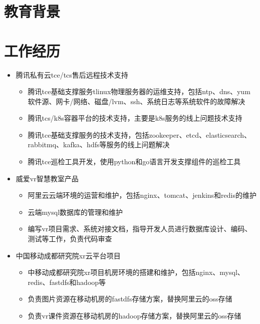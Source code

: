 \documentclass{resume}
\begin{document}
\section{教育背景}

\vspace{4mm}

\section{工作经历}
\begin{itemize}
  \item 腾讯私有云tce/tcs售后远程技术支持
  \begin{itemize}
    \item 腾讯tce基础支撑服务tlinux物理服务器的运维支持，包括ntp、dns、yum软件源、网卡/网络、磁盘/lvm、ssh、系统日志等系统软件的故障解决
    \item 腾讯tcs/k8s容器平台的技术支持，主要是k8s服务的线上问题技术支持
    \item 腾讯tce基础支撑服务的技术支持，包括zookeeper、etcd、elasticsearch、rabbitmq、kafka、hdfs等服务的线上问题解决
    \item 腾讯tce巡检工具开发，使用python和go语言开发支撑组件的巡检工具
  \end{itemize}
\end{itemize}

\begin{itemize}
  \item 威爱vr智慧教室产品
  \begin{itemize}
    \item 阿里云云端环境的运营和维护，包括nginx、tomcat、jenkins和redis的维护
    \item 云端mysql数据库的管理和维护
    \item 编写vr项目需求、系统对接文档，指导开发人员进行数据库设计、编码、测试等工作，负责代码审查
  \end{itemize}
  \item 中国移动成都研究院xr云平台项目
  \begin{itemize}
    \item 中移动成都研究院xr项目机房环境的搭建和维护，包括nginx、mysql、redis、fastdfs和hadoop等
    \item 负责图片资源在移动机房的fastdfs存储方案，替换阿里云的oss存储
    \item 负责vr课件资源在移动机房的hadoop存储方案，替换阿里云的oss存储
  \end{itemize}
\end{itemize}
\end{document}
